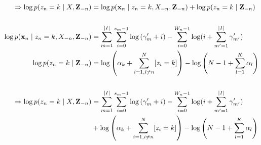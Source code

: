 \begin{enumerate}
    \begin{align*}
       \Rightarrow \operatorname{log}p(z_n = k \mid X, \mathbf{Z}_{-n}) &= \operatorname{log}p(\bold{x}_n \mid  z_n = k, X_{-n}, \mathbf{Z}_{-n}) + \operatorname{log}p(z_n = k \mid \mathbf{Z}_{-n}) 
       \\\\
       \operatorname{log}p(\bold{x}_n \mid  z_n = k, X_{-n}, \mathbf{Z}_{-n}) &=\sum_{m=1}^{\vert I \vert}\sum_{i=0}^{s_m-1}\operatorname{log}\left(\gamma'_m + i\right)- \sum_{i=0}^{W_n-1}\operatorname{log}(i+\sum_{m'=1}^{\vert I \vert} \gamma'_{m'})
       \\
       \operatorname{log}p(z_n = k \mid \mathbf{Z}_{-n}) &= \operatorname{log}\left(\alpha_k + \sum_{i=1, i \neq n}^N[z_i = k]\right) - \log\left( N - 1 + \sum_{l=1}^K \alpha_l\right) 
       \\\\
       \Rightarrow \operatorname{log}p(z_n = k \mid X, \mathbf{Z}_{-n}) &= \sum_{m=1}^{\vert I \vert}\sum_{i=0}^{s_m-1}\operatorname{log}\left(\gamma'_m + i\right)- \sum_{i=0}^{W_n-1}\operatorname{log}(i+\sum_{m'=1}^{\vert I \vert} \gamma'_{m'}) \\ 
       &+ \operatorname{log}\left(\alpha_k + \sum_{i=1, i \neq n}^N[z_i = k]\right) - \log\left( N - 1 + \sum_{l=1}^K \alpha_l\right) 
    \end{align*}
   
 \end{enumerate}


